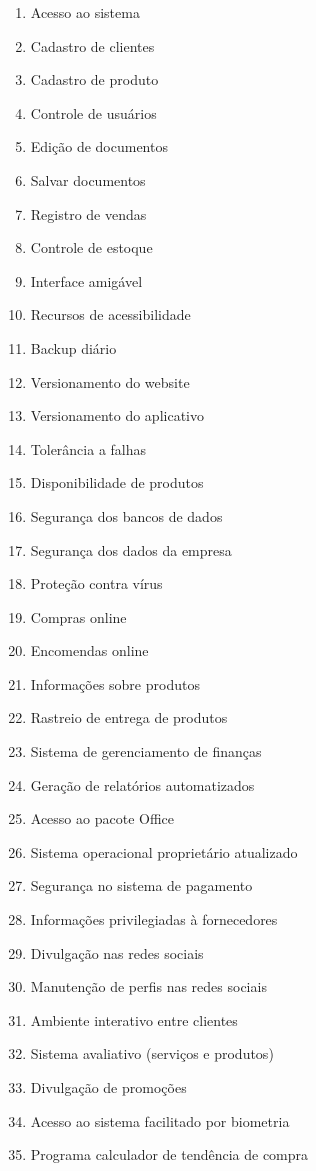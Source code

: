 \begin{enumerate}
	\item Acesso ao sistema
	\item Cadastro de clientes
	\item Cadastro de produto
	\item Controle de usuários
	\item Edição de documentos
	\item Salvar documentos
	\item Registro de vendas
	\item Controle de estoque
	\item Interface amigável 
	\item Recursos de acessibilidade
	\item Backup diário
	\item Versionamento do website
	\item Versionamento do aplicativo
	\item Tolerância a falhas
	\item Disponibilidade de produtos
	\item Segurança dos bancos de dados
	\item Segurança dos dados da empresa
	\item Proteção contra vírus 
	\item Compras online
	\item Encomendas online
	\item Informações sobre produtos
	\item Rastreio de entrega de produtos
	\item Sistema de gerenciamento de finanças
	\item Geração de relatórios automatizados
	\item Acesso ao pacote Office 
	\item Sistema operacional proprietário atualizado 
	\item Segurança no sistema de pagamento 
	\item Informações privilegiadas à fornecedores
	\item Divulgação nas redes sociais 
	\item Manutenção de perfis nas redes sociais
	\item Ambiente interativo entre clientes
	\item Sistema avaliativo (serviços e produtos)
	\item Divulgação de promoções 
	\item Acesso ao sistema facilitado por biometria
	\item Programa calculador de tendência de compra

\end{enumerate}
